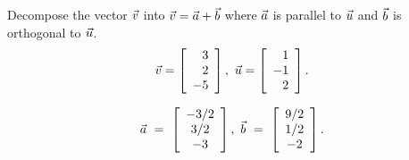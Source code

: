 \documentclass{ximera}
\begin{document}
  \begin{example}
    Decompose the vector $\vect{v}$ into $\vect{v}=\vect{a}+\vect{b}$
    where $\vect{a}$ is parallel to $\vect{u}$ and $\vect{b}$ is
    orthogonal to $\vect{u}$.
    \begin{equation*}
      \vect{v} = \startmat{r} 3\\2\\-5 \stopmat,\quad
      \vect{u} = \startmat{r} 1\\-1\\2 \stopmat.
    \end{equation*}
  
    \begin{solution}
      \begin{equation*}
        \vect{a} ~=~ \startmat{c} -3/2\\3/2\\-3 \stopmat,\quad
        \vect{b} ~=~ \startmat{c} 9/2\\1/2\\-2 \stopmat.
      \end{equation*}
    \end{solution}
  \end{example}
\end{document}
